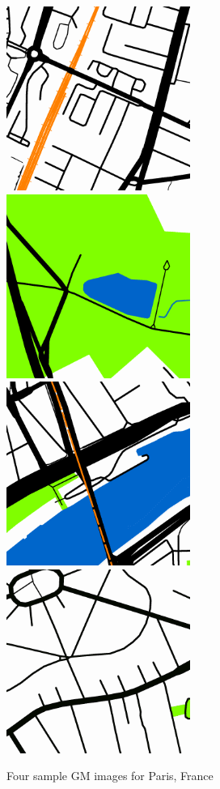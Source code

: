 \documentclass[final,3p,times,authoryear]{elsarticle}
\begin{document}
\begin{figure}[!htbp]
    \centering    
\includegraphics[scale=1]{Images/Map1.png} 
\includegraphics[scale=1]{Images/Map2.png} 
\includegraphics[scale=1]{Images/Map3.png} 
\includegraphics[scale=1]{Images/Map4.png}  
\caption{Four sample GM images for Paris, France \citep{GoogleStatic2017}}    
 \label{fig:maps}  
\end{figure} 
\end{document}
